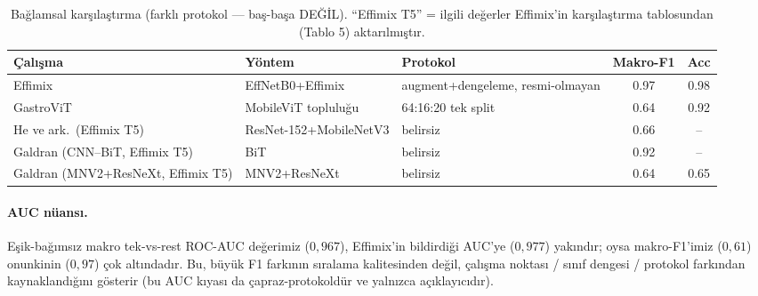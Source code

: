 \begin{table}[H]
\centering
\caption{Bağlamsal karşılaştırma (farklı protokol --- baş-başa DEĞİL).
``Effimix T5'' = ilgili değerler Effimix'in karşılaştırma tablosundan (Tablo 5)
aktarılmıştır.}
\label{tab:cmp-context}
\begin{tabular}{lll cc}
\toprule
Çalışma & Yöntem & Protokol & Makro-F1 & Acc \\
\midrule
Effimix~\cite{ramamurthy2022effimix} & EffNetB0+Effimix & augment+dengeleme, resmi-olmayan & 0.97 & 0.98 \\
GastroViT~\cite{gastrovit2025} & MobileViT topluluğu & 64:16:20 tek split & 0.64 & 0.92 \\
He ve ark.\ (Effimix T5) & ResNet-152+MobileNetV3 & belirsiz & 0.66 & -- \\
Galdran (CNN--BiT, Effimix T5) & BiT & belirsiz & 0.92 & -- \\
Galdran (MNV2+ResNeXt, Effimix T5) & MNV2+ResNeXt & belirsiz & 0.64 & 0.65 \\
\bottomrule
\end{tabular}
\end{table}

\paragraph{AUC nüansı.}
Eşik-bağımsız makro tek-vs-rest ROC-AUC değerimiz ($0{,}967$), Effimix'in
bildirdiği AUC'ye ($0{,}977$) yakındır; oysa makro-F1'imiz ($0{,}61$) onunkinin
($0{,}97$) çok altındadır. Bu, büyük F1 farkının sıralama kalitesinden değil,
çalışma noktası / sınıf dengesi / protokol farkından kaynaklandığını gösterir
(bu AUC kıyası da çapraz-protokoldür ve yalnızca açıklayıcıdır).
